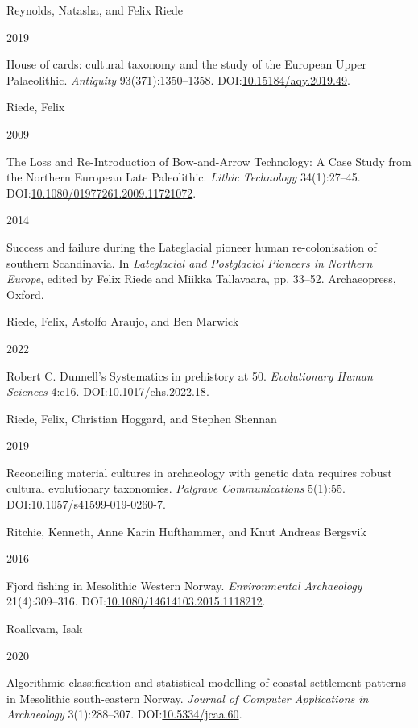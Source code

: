 \documentclass[
  12pt,
  a4paper,
  oneside]{book}
\newlength{\cslhangindent}
\newlength{\csllabelwidth}
\newlength{\cslentryspacingunit} %
\newenvironment{CSLReferences}[2] %
 {%
  \setlength{\parindent}{0pt}
  \ifodd #1
  \let\oldpar\par
  \def\par{\hangindent=\cslhangindent\oldpar}
  \fi
  \setlength{\parskip}{#2\cslentryspacingunit}
 }%
 {}
\newcommand{\CSLBlock}[1]{#1\hfill\break}
\newcommand{\CSLLeftMargin}[1]{\parbox[t]{\csllabelwidth}{#1}}
\newcommand{\CSLRightInline}[1]{\parbox[t]{\linewidth - \csllabelwidth}{#1}\break}
\begin{document}
\begin{CSLReferences}{0}{0}
\leavevmode{}%
\CSLBlock{Reynolds, Natasha, and Felix Riede}
\CSLLeftMargin{ 2019}%
\CSLRightInline{{House of cards: cultural taxonomy and the study of the European Upper Palaeolithic}. \emph{Antiquity} 93(371):1350--1358. DOI:\href{https://doi.org/10.15184/aqy.2019.49}{10.15184/aqy.2019.49}.}

\leavevmode{}%
\CSLBlock{Riede, Felix}
\CSLLeftMargin{ 2009}%
\CSLRightInline{The Loss and Re-Introduction of Bow-and-Arrow Technology: A Case Study from the Northern European Late Paleolithic. \emph{Lithic Technology} 34(1):27--45. DOI:\href{https://doi.org/10.1080/01977261.2009.11721072}{10.1080/01977261.2009.11721072}.}

\leavevmode{}%
\CSLLeftMargin{ 2014 }%
\CSLRightInline{{Success and failure during the Lateglacial pioneer human re-colonisation of southern Scandinavia}. In \emph{{Lateglacial and Postglacial Pioneers in Northern Europe}}, edited by Felix Riede and Miikka Tallavaara, pp. 33--52. Archaeopress, Oxford.}

\leavevmode{}%
\CSLBlock{Riede, Felix, Astolfo Araujo, and Ben Marwick}
\CSLLeftMargin{ 2022}%
\CSLRightInline{{Robert C. Dunnell's Systematics in prehistory at 50}. \emph{Evolutionary Human Sciences} 4:e16. DOI:\href{https://doi.org/10.1017/ehs.2022.18}{10.1017/ehs.2022.18}.}

\leavevmode{}%
\CSLBlock{Riede, Felix, Christian Hoggard, and Stephen Shennan}
\CSLLeftMargin{ 2019}%
\CSLRightInline{Reconciling material cultures in archaeology with genetic data requires robust cultural evolutionary taxonomies. \emph{Palgrave Communications} 5(1):55. DOI:\href{https://doi.org/10.1057/s41599-019-0260-7}{10.1057/s41599-019-0260-7}.}

\leavevmode{}%
\CSLBlock{Ritchie, Kenneth, Anne Karin Hufthammer, and Knut Andreas Bergsvik}
\CSLLeftMargin{ 2016}%
\CSLRightInline{{Fjord fishing in Mesolithic Western Norway}. \emph{Environmental Archaeology} 21(4):309--316. DOI:\href{https://doi.org/10.1080/14614103.2015.1118212}{10.1080/14614103.2015.1118212}.}

\leavevmode{}%
\CSLBlock{Roalkvam, Isak}
\CSLLeftMargin{ 2020}%
\CSLRightInline{{Algorithmic classification and statistical modelling of coastal settlement patterns in Mesolithic south-eastern Norway}. \emph{Journal of Computer Applications in Archaeology} 3(1):288--307. DOI:\href{https://doi.org/10.5334/jcaa.60}{10.5334/jcaa.60}.}


\end{CSLReferences}
\end{document}
